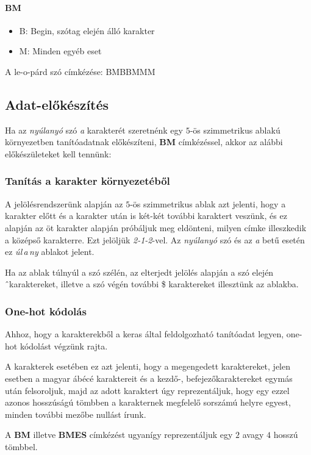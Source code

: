\documentclass[a4paper, magyar]{article}
\begin{document}
\paragraph{BM}
\begin{itemize}
	\item B: Begin, szótag elején álló karakter
	\item M: Minden egyéb eset
\end{itemize}
A
{\selectfont
	le-o-párd%
}
szó címkézése:
{\selectfont
	BMBBMMM%
}
\subsection{Adat-előkészítés}
Ha az \textit{nyúlanyó} szó \textit{a} karakterét szeretnénk egy $5$-ös szimmetrikus ablakú környezetben tanítóadatnak előkészíteni, \textbf{BM} címkézéssel, akkor az alábbi előkészületeket kell tennünk:
\subsubsection{Tanítás a karakter környezetéből}

A jelölésrendszerünk alapján az $5$-ös szimmetrikus ablak azt jelenti, hogy a karakter előtt és a karakter után is két-két további karaktert veszünk, és ez alapján az öt karakter alapján próbáljuk meg eldönteni, milyen címke illeszkedik a középső karakterre. Ezt jelöljük \textit{2-1-2}-vel. Az \textit{nyúlanyó} szó és az \textit{a} betű esetén ez \textit{úl\,a\,ny} ablakot jelent.

Ha az ablak túlnyúl a szó szélén, az elterjedt jelölés alapján a szó elején \^\ karaktereket, illetve a szó végén további \$ karaktereket illesztünk az ablakba.
\subsubsection{One-hot kódolás}

Ahhoz, hogy a karakterekből a keras által feldolgozható tanítóadat legyen, one-hot kódolást végzünk rajta. 

A karakterek esetében ez azt jelenti, hogy a megengedett karaktereket, jelen esetben a magyar ábécé karaktereit és a kezdő-, befejezőkaraktereket egymás után felsoroljuk, majd az adott karaktert úgy reprezentáljuk, hogy egy ezzel azonos hosszúságú tömbben a karakternek megfelelő sorszámú helyre egyest, minden további mezőbe nullást írunk.

A \textbf{BM} illetve \textbf{BMES} címkézést ugyanígy reprezentáljuk egy $2$ avagy $4$ hosszú tömbbel. 
\end{document}
